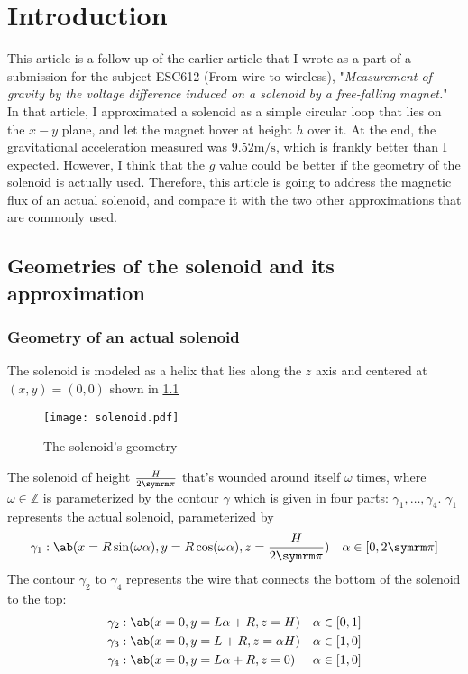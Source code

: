 \chapter{Introduction}

This article is a follow-up of the earlier article that I wrote as a part of a submission for the subject ESC612 (From wire to wireless), "\emph{Measurement of gravity by the voltage difference induced on a solenoid by a free-falling magnet.}" In that article, I approximated a solenoid as a simple circular loop that lies on the $x-y$ plane, and let the magnet hover at height $h$ over it. At the end, the gravitational acceleration measured was $9.52\unit{\meter\per\second}$, which is frankly better than I expected. However, I think that the $g$ value could be better if the geometry of the solenoid is actually used. Therefore, this article is going to address the magnetic flux of an actual solenoid, and compare it with the two other approximations that are commonly used.

\section{Geometries of the solenoid and its approximation}

\subsection{Geometry of an actual solenoid}

The solenoid is modeled as a helix that lies along the $z$ axis and centered at $(x, y) = (0, 0)$ shown in \cref{fig:actual-solenoid}
\begin{figure}[ht]
	\centering
	\texttt{[image: solenoid.pdf]}
	\caption{The solenoid's geometry}
	\label{fig:actual-solenoid}
\end{figure}

The solenoid of height $\frac{H}{2\cpi}$ that's wounded around itself $\omega$ times, where $\omega \in \mathbb{Z}$ is parameterized by the contour $\gamma$ which is given in four parts: $\gamma_1,\dots, \gamma_4$. $\gamma_1$ represents the actual solenoid, parameterized by
\begin{align}
	 & \gamma_1: \ab(x = R\sin(\omega\alpha), y = R\cos(\omega\alpha), z = \frac{H}{2\cpi}) & \alpha \in [0, 2\cpi]
\end{align}
The contour $\gamma_2$ to $\gamma_4$ represents the wire that connects the bottom of the solenoid to the top:
\begin{align}
	 & \gamma_2: \ab(x = 0, y = L\alpha + R, z = H)  & \alpha \in [0, 1] \\
	 & \gamma_3: \ab(x = 0, y = L + R, z = \alpha H) & \alpha \in [1, 0] \\
	 & \gamma_4: \ab(x = 0, y = L\alpha + R, z = 0)  & \alpha \in [1, 0]
\end{align}

